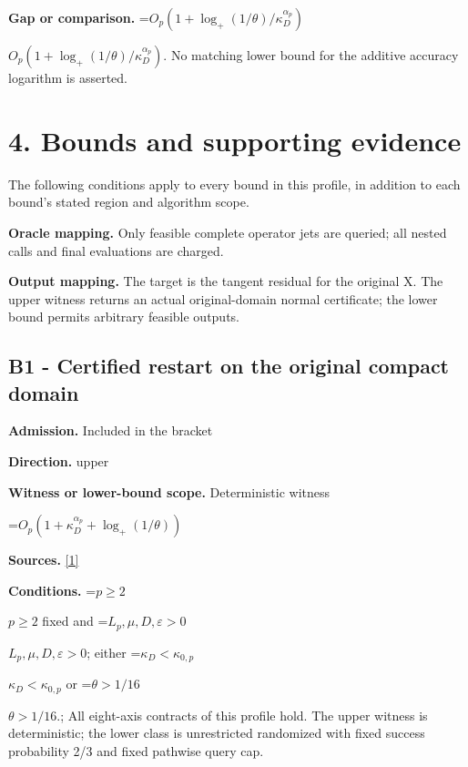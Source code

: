 \documentclass[10pt,a4paper]{article}
\newcommand{\AtlasMath}[1]{\par\begingroup\centering\setbox0=\hbox{$\displaystyle #1$}\ifdim\wd0>1.4\linewidth\typeout{ATLAS WIDE FORMULA: \the\wd0}\fi\ifdim\wd0>\linewidth\resizebox{\linewidth}{!}{\box0}\else\box0\fi\par\endgroup}
\newcommand{\AtlasInlineMath}[1]{\begingroup\setbox0=\hbox{$#1$}\ifdim\wd0>.4\linewidth\endgroup\AtlasMath{#1}\else\endgroup$#1$\fi}
\begin{document}
\textbf{Gap or comparison.} \AtlasInlineMath{O_p(1+\log_+(1/\theta)/\kappa_D^{\alpha_p})}. No matching lower bound for the additive accuracy logarithm is asserted.



\section{4. Bounds and supporting evidence}


The following conditions apply to every bound in this profile, in addition to each bound's stated region and algorithm scope.



\textbf{Oracle mapping.} Only feasible complete operator jets are queried; all nested calls and final evaluations are charged.



\textbf{Output mapping.} The target is the tangent residual for the original X. The upper witness returns an actual original-domain normal certificate; the lower bound permits arbitrary feasible outputs.



\subsection{B1 - Certified restart on the original compact domain}


\textbf{Admission.} Included in the bracket



\textbf{Direction.} upper



\textbf{Witness or lower-bound scope.} Deterministic witness



\AtlasMath{O_p\!\left(1+\kappa_D^{\alpha_p}+\log_+(1/\theta)\right)}


\textbf{Sources.} \href{https://arxiv.org/pdf/2609.23557v1}{[1]}



\textbf{Conditions.} \AtlasInlineMath{p\ge2} fixed and \AtlasInlineMath{L_p,\mu,D,\varepsilon>0}; either \AtlasInlineMath{\kappa_D<\kappa_{0,p}} or \AtlasInlineMath{\theta>1/16}.; All eight-axis contracts of this profile hold. The upper witness is deterministic; the lower class is unrestricted randomized with fixed success probability 2/3 and fixed pathwise query cap.
\end{document}
